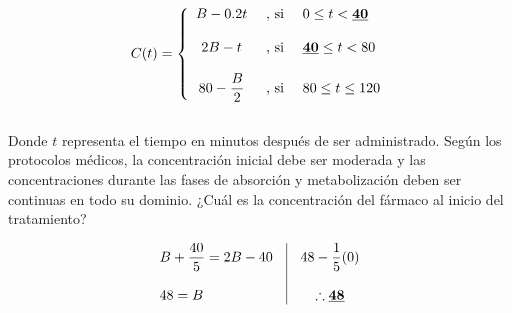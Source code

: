 \documentclass[12pt]{article}
\begin{document}
\[
C(t) = 
\left\{
  \begin{array}{c l l}
    B - 0.2t & \text{ , si } & 0 \leq t < \textbf{\underline{40}} \\\\
    2B - t & \text{ , si } & \textbf{\underline{40}} \leq t < 80 \\\\
    80 - \dfrac{B}{2} & \text{ , si } & 80 \leq t \leq 120
  \end{array}
\right.
\] \\

\noindent Donde $t$ representa el tiempo en minutos después de ser administrado. Según los protocolos médicos,
la concentración inicial debe ser moderada y las concentraciones durante las fases de absorción y metabolización
deben ser continuas en todo su dominio. ¿Cuál es la concentración del fármaco al inicio del tratamiento?

\[
\begin{array}{l|c}
  \begin{array}{l}
    B + \dfrac{40}{5} = 2B - 40 \\\\
    48 = B  
  \end{array}
  &
  \begin{array}{c}
    48 - \dfrac{1}{5}(0) \\\\
    \therefore \textbf{\underline{48}}
  \end{array}
\end{array}
\]
\end{document}
